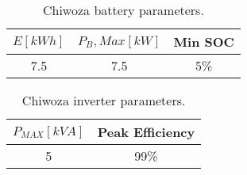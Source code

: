 \begin{table}[]
    \centering
    \begin{tabular}{c|c|c}
         $E[kWh]$& $P_B,Max[kW]$ &Min SOC\\
         \hline
         7.5 & 7.5 & 5\%\\
    \end{tabular}
    \caption[Chiwoza battery parameters]{Chiwoza battery parameters.}
    \label{tab:chiwoza_bat_param}
\end{table}

\begin{table}[]
    \centering
    \begin{tabular}{c|c}
         $P_{MAX}[kVA]$& Peak Efficiency\\
         \hline
         5 & 99\%\\
    \end{tabular}
    \caption[Chiwoza inverter parameters]{Chiwoza inverter parameters.}
    \label{tab:chiwoza_inv_param}
\end{table}

